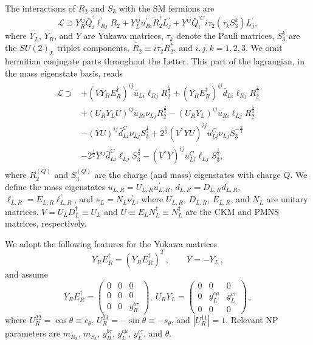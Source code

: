 \documentclass[aps,prd,superscriptaddress,twocolumn,secnumarabic]{revtex4-1}
\begin{document}
\label{sec:setup}
The interactions of $R_2$ and $S_3$ with the SM fermions are
\begin{equation}
\label{eq:one}
\mathcal{L}  \supset Y_{R}^{ij} \bar{Q}^\prime_i \ell^\prime_{Rj} R_2+ Y_L^{ij} \bar{u}^\prime_{Ri} \widetilde{R}_2^\dagger L^\prime_j +Y^{ij} \bar{Q}^{\prime C}_{i} i \tau_2 ( \tau_k S^k_3) L^\prime_{j},
\end{equation}
where $Y_L$, $Y_R$, and $Y$ are Yukawa matrices, $\tau_k$ denote the Pauli matrices, $S_3^k$ are the $SU(2)_L$ triplet components, $\widetilde{R_2} \equiv i \tau_2 R_2^\ast$, and $i,j,k=1,2,3$. We omit hermitian conjugate parts throughout the Letter. This part of the lagrangian, in the mass eigenstate basis, reads
\begin{align}
\label{eq:two}
\begin{split}
\mathcal{L} \supset 
&+(V Y_R E_R^\dagger)^{ij} \bar{u}_{Li}\ell_{Rj}R_2^{\frac{5}{3}} + (Y_R E_R^\dagger)^{ij} \bar{d}_{Li}\ell_{Rj} R_2^{\frac{2}{3}}\\
&+(U_R Y_L U)^{ij} \bar{u}_{Ri} \nu_{Lj} R_2^{\frac{2}{3}}- (U_R Y_L)^{ij} \bar{u}_{Ri}\ell_{Lj} R_2^{\frac{5}{3}}\\
&-(Y U)^{ij} \bar{d}^C_{Li} \nu_{Lj} S_3^{\frac{1}{3}} +2^\frac{1}{2}(V^* Y U)^{ij} \bar{u}^C_{Li} \nu_{Lj} S_3^{-\frac{2}{3}}\\
&- 2^\frac{1}{2} Y^{ij} \bar{d}^C_{Li} \ell_{Lj} S_3^{\frac{4}{3}} -(V^* Y)^{ij} \bar{u}^C_{Li} \ell_{Lj} S_3^{\frac{1}{3}},
\end{split} 
\end{align}
where $R_2^{(Q)}$ and $S_3^{(Q)}$ are the charge (and mass)
eigenstates with charge $Q$. We define the mass eigenstates
$u_{L,R}=U_{L,R} u^\prime_{L,R}$, $d_{L,R}=D_{L,R} d^\prime_{L,R}$,
$\ell_{L,R}=E_{L,R} \ell^\prime_{L,R}$, and
$\nu_{L}=N_L \nu^\prime_{L}$, where
$U_{L,R}$,
$D_{L,R}$, $E_{L,R}$, and $N_L$ are unitary matrices.
$V= U_L D_L^\dagger \equiv U_L$ and
$U\equiv E_L N_L^\dagger \equiv N_L^\dagger$ are the CKM and PMNS
matrices, respectively.

We adopt the following features for the Yukawa matrices
\begin{equation}
\label{eq:yL-yR-y}
Y_R E_R^\dagger=(Y_R E_R^\dagger)^T\,, \qquad Y=-Y_L\,,
\end{equation}
and assume 
\begin{equation}
\label{eq:yL-yR}
Y_R E_R^\dagger = \begin{pmatrix}
0 & 0 & 0\\ 
0 & 0 & 0\\ 
0 & 0 & y_R^{b\tau}
\end{pmatrix},~ 
U_R Y_L = \begin{pmatrix}
0 & 0 & 0\\ 
0 & y_L^{c\mu} & y_L^{c\tau}\\ 
0 & 0 & 0
\end{pmatrix}\,,
\end{equation}
where $U_R^{22}=\cos \theta \equiv c_\theta$, $U_R^{23}=-\sin \theta \equiv -s_\theta$, and $|U_R^{11}|=1$. Relevant NP parameters are $m_{R_2}$, $m_{S_3}$, $y_R^{b\tau}$, $y_L^{c\mu}$, $y_L^{c\tau}$, and $\theta$.
\end{document}
